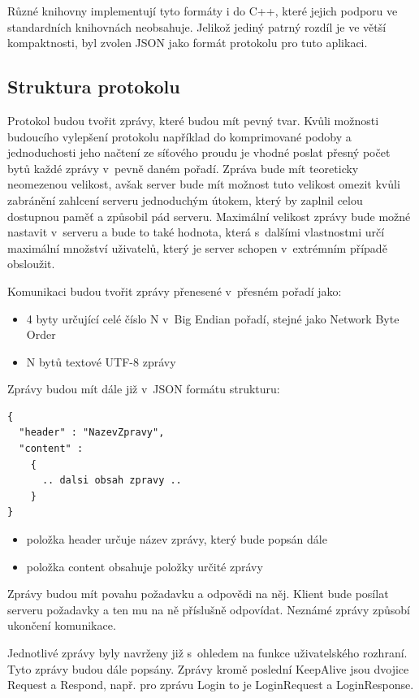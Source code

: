 \documentclass[thesis=B,czech]{FITthesis}[2013/10/20]
\begin{document}
Různé knihovny implementují tyto formáty i do C++, které jejich podporu ve standardních knihovnách neobsahuje. Jelikož jediný patrný rozdíl je ve větší kompaktnosti, byl zvolen JSON jako formát protokolu pro tuto aplikaci.

\subsection{Struktura protokolu}

Protokol budou tvořit zprávy, které budou mít pevný tvar. Kvůli možnosti budoucího vylepšení protokolu například do komprimované podoby a jednoduchosti jeho načtení ze síťového proudu je vhodné poslat přesný počet bytů každé zprávy v~pevně daném pořadí. Zpráva bude mít teoreticky neomezenou velikost, avšak server bude mít možnost tuto velikost omezit kvůli zabránění zahlcení serveru jednoduchým útokem, který by zaplnil celou dostupnou paměť a způsobil pád serveru. Maximální velikost zprávy bude možné nastavit v~serveru a bude to také hodnota, která s~dalšími vlastnostmi určí maximální množství uživatelů, který je server schopen v~extrémním případě obsloužit.

Komunikaci budou tvořit zprávy přenesené v~přesném pořadí jako:

\begin{itemize}
  \item{4 byty určující celé číslo N v~Big Endian pořadí, stejné jako Network Byte Order}
  \item{N bytů textové UTF-8 zprávy}
\end{itemize}

Zprávy budou mít dále již v~JSON formátu strukturu:
\begin{lstlisting}
{
  "header" : "NazevZpravy",
  "content" :
    {
      .. dalsi obsah zpravy ..
    }
}
\end{lstlisting}

\begin{itemize}
  \item{položka header určuje název zprávy, který bude popsán dále}
  \item{položka content obsahuje položky určité zprávy}
\end{itemize}

Zprávy budou mít povahu požadavku a odpovědi na něj. Klient bude posílat serveru požadavky a ten mu na ně příslušně odpovídat. Neznámé zprávy způsobí ukončení komunikace.

Jednotlivé zprávy byly navrženy již s~ohledem na funkce uživatelského rozhraní. Tyto zprávy budou dále popsány. Zprávy kromě poslední KeepAlive jsou dvojice Request a Respond, např. pro zprávu Login to je LoginRequest a LoginResponse.
\end{document}
